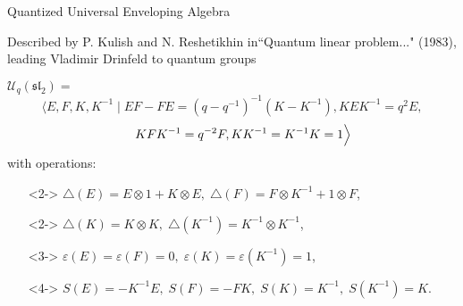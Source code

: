 \documentclass{beamer}
\begin{document}
\begin{frame}{Quantized Universal Enveloping Algebra}


Described by P. Kulish and N. Reshetikhin in``Quantum linear problem..." (1983), leading Vladimir Drinfeld to quantum groups

$\mathcal{U}_q(\mathfrak{sl}
_2)=$
\[
\Big\langle E,F,K,K^{-1}\;\vert\;EF-FE=(q-q^{-1})^{-1}\left(K-K^{-1}\right), KEK^{-1}=q^2 E, \]\[\hspace{4ex}KFK^{-1}=q^{-2}F, KK^{-1}=K^{-1}K=1\Big\rangle
\]
with operations:
\vspace{0.5ex}
\begin{itemize}
\setlength{\itemsep}{1.5ex}
    \item[]<2-> $\triangle(E)=E\otimes 1+K\otimes E,\; \triangle(F)=F\otimes K^{-1}+ 1\otimes F$, \item[]<2-> $\triangle(K)=K\otimes K,\; \triangle(K^{-1})=K^{-1}\otimes K^{-1}$,
    \item[]<3-> $\varepsilon(E)=\varepsilon(F)=0,\; \varepsilon(K)=\varepsilon(K^{-1})=1$,
    \item[]<4-> $S(E)=-K^{-1}E,\; S(F)=-F K, \;S(K)=K^{-1},\; S(K^{-1})=K$.
\end{itemize}


\end{frame}
\end{document}
